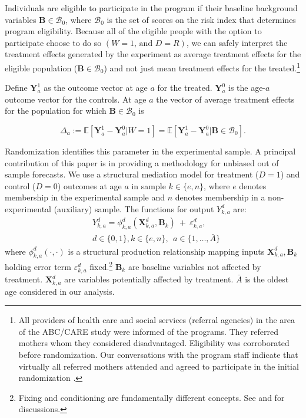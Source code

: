 Individuals are eligible to participate in the program if their baseline background variables $\bm{B}\in\mathcal{B}_0$, where $\mathcal{B}_0$ is the set of scores on the risk index that determines program eligibility. Because all of the eligible people with the option to participate choose to do so $(W=1\text{, and } D=R)$, we can safely interpret the treatment effects generated by the experiment as average treatment effects for the eligible population ($\bm{B}\in\mathcal{B}_0$) and not just mean treatment effects for the treated.\footnote{All providers of health care and social services (referral agencies) in the area of the ABC/CARE study were informed of the programs. They referred mothers whom they considered disadvantaged. Eligibility was corroborated before randomization. Our conversations with the program staff indicate that virtually all referred mothers attended and agreed to participate in the initial randomization \citep{Ramey-etal_2012-ABC}.}

Define $\bm{Y}^1_a$ as the outcome vector at age $a$ for the treated. $\bm{Y}^0_a$ is the age-$a$ outcome vector for the controls. At age $a$ the vector of average treatment effects for the population for which $\bm{B}\in\mathcal{B}_0$ is

\begin{equation}
\Delta_a  := \mathbb{E} \left[ \bm{Y}^1_a - \bm{Y}^0_a | W = 1 \right] = \mathbb{E} \left[\bm{Y}^1_a - \bm{Y}^0_{a} | \bm{B} \in \mathcal{B}_0 \right]. \label{eq:mainte}
\end{equation}

Randomization identifies this parameter in the experimental sample. A principal contribution of this paper is in providing a methodology for unbiased out of sample forecasts. We use a structural mediation model for treatment ($D=1$) and control ($D=0$) outcomes at age $a$ in sample $k \in \{e,n\}$, where $e$ denotes membership in the experimental sample and $n$ denotes membership in a non-experimental (auxiliary) sample. The functions for output $Y^d_{k,a}$ are:
\begin{eqnarray}
&Y^d_{k,a} = \phi^d_{k,a} (\bm{X}^d_{k,a}, \bm{B}_k) \ + \ \varepsilon^d_{k,a},  \label{eq:outcome} \\
 &d \in\{0,1\},  k\in\{e,n\}, \ \ a\in\{1,\dots,\bar{A}\} \nonumber
\end{eqnarray}
where $\phi^d_{k,a}\left( \cdot, \cdot \right)$ is a structural production relationship mapping inputs $\bm{X}^d_{k,a}, \bm{B}_k$ holding error term $\varepsilon^d_{k,a}$ fixed.\footnote{Fixing and conditioning are fundamentally different concepts. See \cite{Haavelmo_1943_Econometrica} and \citet{Heckman_Pinto_2015_EconometTheory} for discussions.} $ \bm{B}_k$ are baseline variables not affected by treatment. $\bm{X}^d_{k,a}$ are variables potentially affected by treatment. $\bar{A}$ is the oldest age considered in our analysis.

